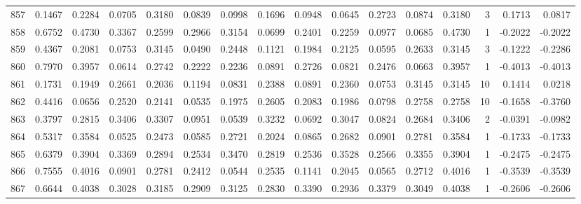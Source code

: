 \begin{tabular}{lrrrrrrrrrrrrrrr}
857 &      0.1467 &  0.2284 &  0.0705 &  0.3180 &  0.0839 &  0.0998 &  0.1696 &  0.0948 &  0.0645 &  0.2723 &   0.0874 &     0.3180 &      3 &                    0.1713 &                     0.0817 \\
858 &      0.6752 &  0.4730 &  0.3367 &  0.2599 &  0.2966 &  0.3154 &  0.0699 &  0.2401 &  0.2259 &  0.0977 &   0.0685 &     0.4730 &      1 &                   -0.2022 &                    -0.2022 \\
859 &      0.4367 &  0.2081 &  0.0753 &  0.3145 &  0.0490 &  0.2448 &  0.1121 &  0.1984 &  0.2125 &  0.0595 &   0.2633 &     0.3145 &      3 &                   -0.1222 &                    -0.2286 \\
860 &      0.7970 &  0.3957 &  0.0614 &  0.2742 &  0.2222 &  0.2236 &  0.0891 &  0.2726 &  0.0821 &  0.2476 &   0.0663 &     0.3957 &      1 &                   -0.4013 &                    -0.4013 \\
861 &      0.1731 &  0.1949 &  0.2661 &  0.2036 &  0.1194 &  0.0831 &  0.2388 &  0.0891 &  0.2360 &  0.0753 &   0.3145 &     0.3145 &     10 &                    0.1414 &                     0.0218 \\
862 &      0.4416 &  0.0656 &  0.2520 &  0.2141 &  0.0535 &  0.1975 &  0.2605 &  0.2083 &  0.1986 &  0.0798 &   0.2758 &     0.2758 &     10 &                   -0.1658 &                    -0.3760 \\
863 &      0.3797 &  0.2815 &  0.3406 &  0.3307 &  0.0951 &  0.0539 &  0.3232 &  0.0692 &  0.3047 &  0.0824 &   0.2684 &     0.3406 &      2 &                   -0.0391 &                    -0.0982 \\
864 &      0.5317 &  0.3584 &  0.0525 &  0.2473 &  0.0585 &  0.2721 &  0.2024 &  0.0865 &  0.2682 &  0.0901 &   0.2781 &     0.3584 &      1 &                   -0.1733 &                    -0.1733 \\
865 &      0.6379 &  0.3904 &  0.3369 &  0.2894 &  0.2534 &  0.3470 &  0.2819 &  0.2536 &  0.3528 &  0.2566 &   0.3355 &     0.3904 &      1 &                   -0.2475 &                    -0.2475 \\
866 &      0.7555 &  0.4016 &  0.0901 &  0.2781 &  0.2412 &  0.0544 &  0.2535 &  0.1141 &  0.2045 &  0.0565 &   0.2712 &     0.4016 &      1 &                   -0.3539 &                    -0.3539 \\
867 &      0.6644 &  0.4038 &  0.3028 &  0.3185 &  0.2909 &  0.3125 &  0.2830 &  0.3390 &  0.2936 &  0.3379 &   0.3049 &     0.4038 &      1 &                   -0.2606 &                    -0.2606 \\

\end{tabular}
